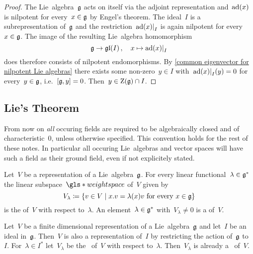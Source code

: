 \begin{proof}
  The Lie~algebra~$\glie$ acts on itself via the adjoint representation and~$\operatorname{ad}(x)$ is nilpotent for every~$x \in \mathfrak{g}$ by Engel’s theorem.
  The ideal~$I$ is a subrepresentation of~$\glie$ and the restriction~$\restrict{\ad(x)}{I}$ is again nilpotent for every~$x \in \mathfrak{g}$.
  The image of the resulting Lie~algebra homomorphism
  \[
    \glie
    \to
    \gllie(I) \,,
    \quad
    x
    \mapsto
    \restrict{\ad(x)}{I}
  \]
  does therefore consists of nilpotent endomorphisms.
  By \cref{common eigenvector for nilpotent Lie algebras} there exists some non-zero~$y \in I$ with~$\restrict{\ad(x)}{I}(y) = 0$ for every~$y \in \mathfrak{g}$, i.e.~$[\mathfrak{g}, y] = 0$.
  Then~$y \in \operatorname{Z}(\mathfrak{g}) \cap I$.
\end{proof}





\subsection{Lie’s Theorem}


\begin{convention}
  From now on \emph{all} occuring fields are required to be algebraically closed and of characteristic~$0$, unless otherwise specified.
  This convention holds for the rest of these notes.
  In particular all occuring Lie~algebras and vector spaces will have such a field as their ground field, even if not explicitely stated.
\end{convention}


\begin{definition}
  Let~$V$ be a representation of a Lie~algebra~$\glie$.
  For every linear functional~$\lambda \in \mathfrak{g}^*$ the linear subspace~$\gls*{weight space}$ of~$V$ given by
  \[
    V_\lambda
    \defined
    \{
      v \in V
    \suchthat
      \text{$x.v = \lambda(x) v$ for every~$x \in \glie$}
    \}
  \]
  is the  of~$V$ with respect to~$\lambda$.
  An element~$\lambda \in \mathfrak{g}^*$ with~$V_\lambda \neq 0$ is a  of~$V$.
\end{definition}


\begin{lemma}
  Let~$V$ be a finite dimensional representation of a Lie~algebra~$\glie$ and let~$I$ be an ideal in~$\glie$.
  Then~$V$ is also a representation of~$I$ by restricting the action of~$\glie$ to~$I$.
  For~$\lambda \in I^*$ let~$V_\lambda$ be the~{} of~$V$ with respect to~$\lambda$.
  Then~$V_\lambda$ is already a~{\subrepresentation{$\glie$}} of~$V$.
\end{lemma}


